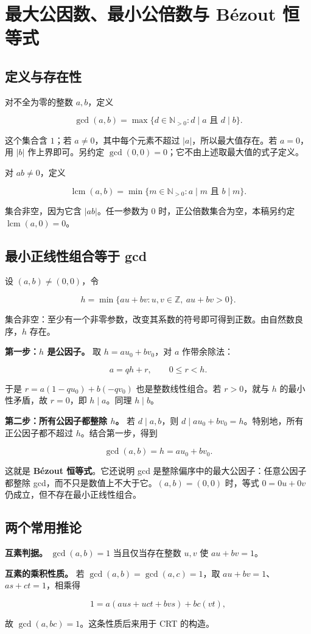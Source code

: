 \section{最大公因数、最小公倍数与 Bézout 恒等式}


\subsection{定义与存在性}


对不全为零的整数 $a,b$，定义

\[
\gcd(a,b)=\max\{d\in\mathbb N_{>0}:d\mid a\text{ 且 }d\mid b\}.
\]

这个集合含 $1$；若 $a\ne0$，其中每个元素不超过 $|a|$，所以最大值存在。若 $a=0$，用 $|b|$ 作上界即可。另约定 $\gcd(0,0)=0$；它不由上述取最大值的式子定义。

对 $ab\ne0$，定义

\[
\operatorname{lcm}(a,b)=\min\{m\in\mathbb N_{>0}:a\mid m\text{ 且 }b\mid m\}.
\]

集合非空，因为它含 $|ab|$。任一参数为 $0$ 时，正公倍数集合为空，本稿另约定 $\operatorname{lcm}(a,0)=0$。

\subsection{最小正线性组合等于 gcd}


设 $(a,b)\ne(0,0)$，令

\[
h=\min\{au+bv:u,v\in\mathbb Z,\ au+bv>0\}.
\]

集合非空：至少有一个非零参数，改变其系数的符号即可得到正数。由自然数良序，$h$ 存在。

\textbf{第一步：$h$ 是公因子。} 取 $h=au_0+bv_0$，对 $a$ 作带余除法：

\[
a=qh+r,\qquad 0\le r<h.
\]

于是 $r=a(1-qu_0)+b(-qv_0)$ 也是整数线性组合。若 $r>0$，就与 $h$ 的最小性矛盾，故 $r=0$，即 $h\mid a$。同理 $h\mid b$。

\textbf{第二步：所有公因子都整除 $h$。} 若 $d\mid a,b$，则 $d\mid au_0+bv_0=h$。特别地，所有正公因子都不超过 $h$。结合第一步，得到

\[
\gcd(a,b)=h=au_0+bv_0.
\]

这就是 \textbf{Bézout 恒等式}。它还说明 gcd 是整除偏序中的最大公因子：任意公因子都整除 gcd，而不只是数值上不大于它。$(a,b)=(0,0)$ 时，等式 $0=0u+0v$ 仍成立，但不存在最小正线性组合。

\subsection{两个常用推论}


\textbf{互素判据。} $\gcd(a,b)=1$ 当且仅当存在整数 $u,v$ 使 $au+bv=1$。

\textbf{互素的乘积性质。} 若 $\gcd(a,b)=\gcd(a,c)=1$，取 $au+bv=1$、$as+ct=1$，相乘得

\[
1=a(aus+uct+bvs)+bc(vt),
\]

故 $\gcd(a,bc)=1$。这条性质后来用于 CRT 的构造。
